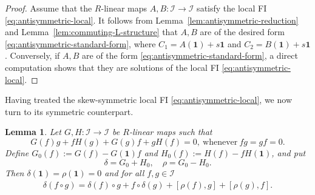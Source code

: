 \documentclass[reqno]{amsart}
\numberwithin{equation}{section}
\theoremstyle{plain}
\newtheorem{lemma}[theorem]{Lemma}
\theoremstyle{definition}
\newcommand{\I}{\mathcal I}
\newcommand{\one}{\mathbf 1}
\begin{document}
\begin{proof}
Assume that the $R$-linear maps $A,B:\I\to\I$ satisfy the local FI \eqref{eq:antisymmetric-local}.
It follows from Lemma~\ref{lem:antisymmetric-reduction} and Lemma~\ref{lem:commuting-L-structure} that
$A,B$ are of the desired form \eqref{eq:antisymmetric-standard-form},
where $C_1=A(\one)+s\one$ and $C_2=B(\one)+s\one$.
Conversely, if $A,B$ are of the form \eqref{eq:antisymmetric-standard-form},
a direct computation shows that they are solutions of the local FI \eqref{eq:antisymmetric-local}.
\end{proof}

Having treated the skew-symmetric local FI \eqref{eq:antisymmetric-local}, we now turn to its
symmetric counterpart.

\begin{lemma}\label{lem:symmetric-reduction}
Let $G,H: \I\to\I$ be $R$-linear maps such that
\begin{equation}\label{eq:symmetric-local}
G(f)g+fH(g)+G(g)f+gH(f)=0,~\text{whenever}~fg=gf=0.
\end{equation}
Define
$G_0(f):=G(f)-G(\one)f$ and $H_0(f):=H(f)-fH(\one)$,
and put
\begin{equation}\label{eq:delta-rho-definition}
\delta=G_0+H_0,
\quad
\rho=G_0-H_0.
\end{equation}
Then $\delta(\one)=\rho(\one)=0$ and for all $f,g\in\I$
\begin{equation}\label{eq:symmetric-master}
\begin{aligned}
\delta(f\circ g)=\delta(f)\circ g+f\circ\delta(g)+[\rho(f),g]+[\rho(g),f].
\end{aligned}
\end{equation}
\end{lemma}
\end{document}
